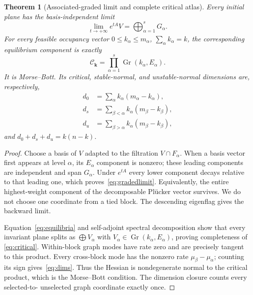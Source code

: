 \documentclass[10pt]{article}
\newtheorem{theorem}{Theorem}
\newcommand{\Gr}{\operatorname{Gr}}
\begin{document}
\begin{theorem}[Associated-graded limit and complete critical atlas]
Every initial plane has the basis-independent limit
\begin{equation}\label{eq:gradedlimit}
 \lim_{t\to+\infty}e^{tA}V=\bigoplus_{\alpha=1}^sG_\alpha.
\end{equation}
For every feasible occupancy vector
$0\le k_\alpha\le m_\alpha$, $\sum_\alpha k_\alpha=k$, the corresponding
equilibrium component is exactly
\begin{equation}\label{eq:critical}
 \mathcal C_{\boldsymbol k}=\prod_{\alpha=1}^s\Gr(k_\alpha,E_\alpha).
\end{equation}
It is Morse--Bott.  Its critical, stable-normal, and unstable-normal dimensions
are, respectively,
\begin{align}
 d_0&=\sum_\alpha k_\alpha(m_\alpha-k_\alpha),\label{eq:dims}\\
 d_s&=\sum_{\beta<\alpha}k_\alpha(m_\beta-k_\beta),\\
 d_u&=\sum_{\beta>\alpha}k_\alpha(m_\beta-k_\beta),
\end{align}
and $d_0+d_s+d_u=k(n-k)$.
\end{theorem}
\begin{proof}
Choose a basis of $V$ adapted to the filtration $V\cap F_\alpha$.  When a
basis vector first appears at level $\alpha$, its $E_\alpha$ component is
nonzero; these leading components are independent and span $G_\alpha$.
Under $e^{tA}$ every lower component decays relative to that leading one,
which proves~\eqref{eq:gradedlimit}.  Equivalently, the entire highest-weight
component of the decomposable Pl\"ucker vector survives.  We do not choose one
coordinate from a tied block.  The descending eigenflag gives the backward
limit.

Equation~\eqref{eq:equilibria} and self-adjoint spectral decomposition show
that every invariant plane splits as $\bigoplus V_\alpha$ with
$V_\alpha\in\Gr(k_\alpha,E_\alpha)$, proving completeness of
\eqref{eq:critical}.  Within-block graph modes have rate zero and are precisely
tangent to this product.  Every cross-block mode has the nonzero rate
$\mu_\beta-\mu_\alpha$; counting its sign gives~\eqref{eq:dims}.  Thus the
Hessian is nondegenerate normal to the critical product, which is the
Morse--Bott condition.  The dimension closure counts every selected-to-
unselected graph coordinate exactly once.
\end{proof}
\fi
\end{document}
